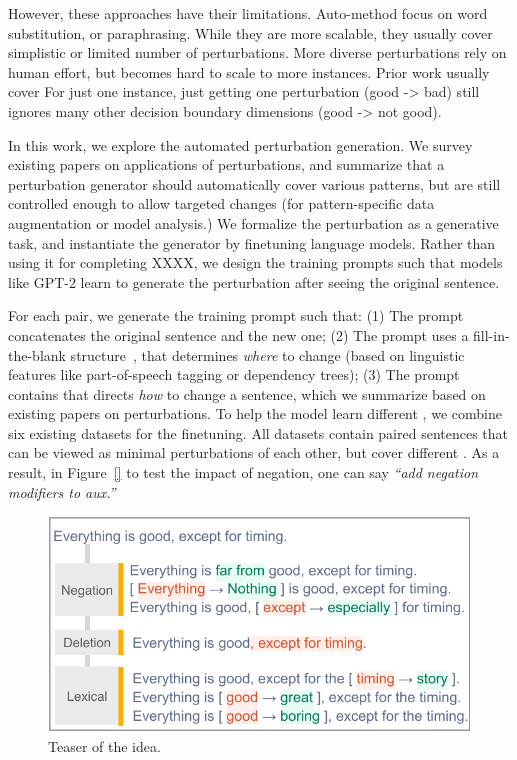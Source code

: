 However, these approaches have their limitations. 
Auto-method focus on word substitution, or paraphrasing. While they are more scalable, they usually cover simplistic or limited number of perturbations.
More diverse perturbations rely on human effort, but becomes hard to scale to more instances.
Prior work usually cover For just one instance, just getting one perturbation (good -> bad) still ignores many other decision boundary dimensions (good -> not good). 

In this work, we explore the automated perturbation generation.
We survey existing papers on applications of perturbations, and summarize that a perturbation generator should automatically cover various patterns, but are still controlled enough to allow targeted changes (for pattern-specific data augmentation or model analysis.)
We formalize the perturbation as a generative task, and instantiate the generator by finetuning language models.
Rather than using it for completing XXXX, we design the training prompts such that models like GPT-2 learn to generate the perturbation after seeing the original sentence.


For each pair, we generate the training prompt such that:
(1) The prompt concatenates the original sentence and the new one;  
(2) The prompt uses a fill-in-the-blank structure~\cite{}, that determines \emph{where} to change (based on linguistic features like part-of-speech tagging or dependency trees);
(3) The prompt contains \tagstrs that directs \emph{how} to change a sentence, which we summarize based on existing papers on perturbations.
To help the model learn different \tagstrs, we combine six existing datasets for the finetuning.
All datasets contain paired sentences that can be viewed as minimal perturbations of each other, but cover different \tagstrs.
As a result, in Figure~\ref{} to test the impact of negation, one can say \emph{``add negation modifiers to aux.''}

\begin{figure}[t]
\centering
\includegraphics[width=1\columnwidth]{figures/teaser}
\vspace{-15pt}
\caption{Teaser of the idea. }
\vspace{-10pt}
\label{fig:mturk_instruction}
\end{figure}


